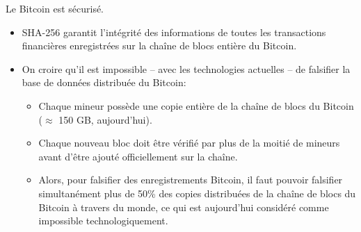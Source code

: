 

\begin{frame}{\LARGE Le Bitcoin est s\'ecuris\'e.}

\normalsize

\begin{itemize}
\item
	SHA-256 garantit l'int\'egrit\'e des informations de
	toutes les transactions financi\`eres enregistr\'ees
	sur la cha\^ine de blocs enti\`ere du Bitcoin.

\vskip 0.4cm
\item
	On croire qu'il est impossible -- avec les technologies actuelles --
	de falsifier la base de donn\'ees {\color{red}distribu\'ee} du Bitcoin:
	\vskip 0.05cm
	\begin{itemize}
	\item
		Chaque mineur poss\`ede une copie enti\`ere de la cha\^ine de blocs du Bitcoin ($\approx$ 150 GB, aujourd'hui).
	\vskip 0.15cm
	\item
		Chaque nouveau bloc doit \^etre v\'erifi\'e par plus de la moiti\'e de mineurs
		avant d'\^etre ajout\'e officiellement sur la cha\^ine.
	\vskip 0.15cm
	\item
		Alors, pour falsifier des enregistrements Bitcoin, il faut pouvoir falsifier
		{\color{red}simultan\'ement plus de 50\%} des copies distribu\'ees
		de la cha\^ine de blocs du Bitcoin \`a travers du monde,
		ce qui est aujourd'hui consid\'er\'e comme impossible technologiquement.
	\end{itemize}
\end{itemize}

\end{frame}
\normalsize

